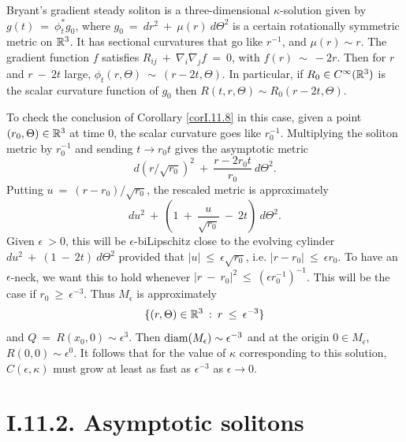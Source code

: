 Bryant's gradient steady soliton is a
three-dimensional $\kappa$-solution given by
$g(t) \: = \: \phi_t^* g_0$, where $g_0 \: = \: dr^2 \: + \: \mu(r) \:
d\Theta^2$ is a certain rotationally symmetric metric on ${\mathbb R}^3$. It has
sectional curvatures that go like $r^{-1}$, and $\mu(r) \sim r$.
The gradient function $f$ satisfies $R_{ij} \: + \: \nabla_i \nabla_j f
\: = \: 0$, with $f(r) \: \sim \: -2r$. Then for $r$ and $r \: - \: 2t$
large, $\phi_t(r, \Theta) \: \sim \: (r-2t, \Theta)$. In particular,
if $R_0 \in C^\infty({\mathbb R}^3)$ is the scalar curvature function of
$g_0$ then $R(t, r, \Theta) \sim R_0(r-2t, \Theta)$.

To check the conclusion of Corollary \ref{corI.11.8}
in this case,
given a point $(r_0, \Theta) \in {\mathbb R}^3$ at time $0$, the scalar
curvature goes like $r_0^{-1}$. Multiplying the soliton metric by
$r_0^{-1}$ and sending $t \rightarrow r_0 t$ gives the asymptotic metric
\begin{equation}
d(r/\sqrt{r_0})^2 \:
+ \: \frac{r-2r_0t}{r_0} \: d\Theta^2.
\end{equation}
Putting $u \: = \: (r - r_0)/\sqrt{r_0}$,
the rescaled metric is approximately
\begin{equation}
du^2 \: + \:
\left( 1 \: + \: \frac{u}{\sqrt{r_0}} \: - \: {2t} \right)
\: d\Theta^2.
\end{equation}
Given $\epsilon \: > 0$, this will be $\epsilon$-biLipschitz close to
the evolving cylinder
$du^2 \: + \:
\left( 1 \: - \: {2t} \right)
\: d\Theta^2$ provided that $|u| \: \le \: \epsilon \sqrt{r_0}$,
i.e. $|r-r_0| \: \le \: \epsilon r_0$. To have an $\epsilon$-neck,
we want this to hold whenever $|r \: - \: r_0|^2 \: \le \:
(\epsilon r_0^{-1})^{-1}$. This will be the case if $r_0 \: \ge \:
\epsilon^{-3}$. Thus $M_\epsilon$ is approximately
\begin{equation}
\{ (r, \Theta) \in {\mathbb R}^3 \: : \: r \: \le \: \epsilon^{-3} \}
\end{equation}
and $Q \: = \: R(x_0,0) \sim \epsilon^3$.
Then $\operatorname{diam}(M_\epsilon) \sim \epsilon^{-3}$
and at the origin $0 \in M_\epsilon$,
$R(0, 0) \sim \epsilon^0$. It follows that for the value of
$\kappa$ corresponding to this solution, $C(\epsilon, \kappa)$ must
grow at least as fast as $\epsilon^{-3}$ as $\epsilon \rightarrow 0$.

\section{I.11.2. Asymptotic solitons} \label{I.11.2}

